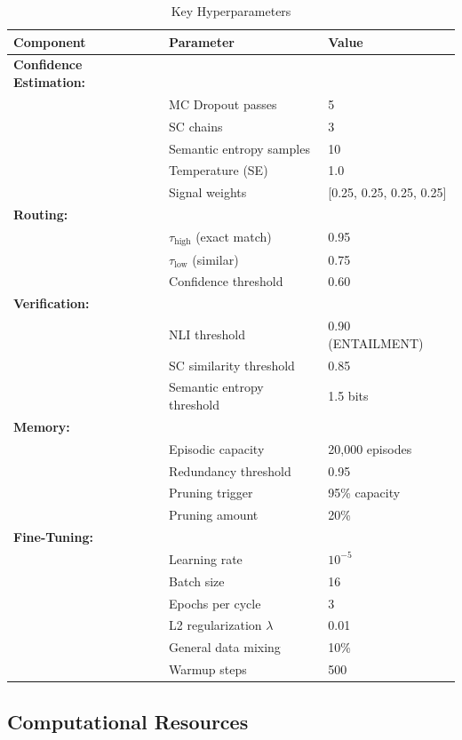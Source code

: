 \documentclass[12pt,a4paper]{article}
\theoremstyle{definition}
\begin{document}
\begin{table}[htbp]
\centering
\caption{Key Hyperparameters}
\begin{tabular}{lll}
\toprule
\textbf{Component} & \textbf{Parameter} & \textbf{Value} \\
\midrule
\textbf{Confidence Estimation:} & & \\
& MC Dropout passes & 5 \\
& SC chains & 3 \\
& Semantic entropy samples & 10 \\
& Temperature (SE) & 1.0 \\
& Signal weights & [0.25, 0.25, 0.25, 0.25] \\
\midrule
\textbf{Routing:} & & \\
& $\tau_{\text{high}}$ (exact match) & 0.95 \\
& $\tau_{\text{low}}$ (similar) & 0.75 \\
& Confidence threshold & 0.60 \\
\midrule
\textbf{Verification:} & & \\
& NLI threshold & 0.90 (ENTAILMENT) \\
& SC similarity threshold & 0.85 \\
& Semantic entropy threshold & 1.5 bits \\
\midrule
\textbf{Memory:} & & \\
& Episodic capacity & 20,000 episodes \\
& Redundancy threshold & 0.95 \\
& Pruning trigger & 95\% capacity \\
& Pruning amount & 20\% \\
\midrule
\textbf{Fine-Tuning:} & & \\
& Learning rate & $10^{-5}$ \\
& Batch size & 16 \\
& Epochs per cycle & 3 \\
& L2 regularization $\lambda$ & 0.01 \\
& General data mixing & 10\% \\
& Warmup steps & 500 \\
\bottomrule
\end{tabular}
\end{table}

\subsection{Computational Resources}
\end{document}
